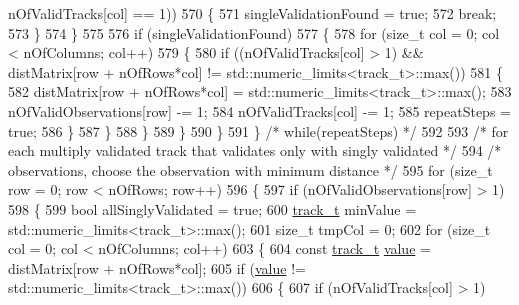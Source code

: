 \begin{DoxyCode}
      nOfValidTracks[col] == 1))
570                         \{
571                             singleValidationFound = \textcolor{keyword}{true};
572                             \textcolor{keywordflow}{break};
573                         \}
574                     \}
575 
576                     \textcolor{keywordflow}{if} (singleValidationFound)
577                     \{
578                         \textcolor{keywordflow}{for} (\textcolor{keywordtype}{size\_t} col = 0; col < nOfColumns; col++)
579                         \{
580                             \textcolor{keywordflow}{if} ((nOfValidTracks[col] > 1) && distMatrix[row + nOfRows*col] != 
      std::numeric\_limits<track\_t>::max())
581                             \{
582                                 distMatrix[row + nOfRows*col] = std::numeric\_limits<track\_t>::max();
583                                 nOfValidObservations[row] -= 1;
584                                 nOfValidTracks[col] -= 1;
585                                 repeatSteps = \textcolor{keyword}{true};
586                             \}
587                         \}
588                     \}
589                 \}
590             \}
591         \} \textcolor{comment}{/* while(repeatSteps) */}
592 
593         \textcolor{comment}{/* for each multiply validated track that validates only with singly validated  */}
594         \textcolor{comment}{/* observations, choose the observation with minimum distance */}
595         \textcolor{keywordflow}{for} (\textcolor{keywordtype}{size\_t} row = 0; row < nOfRows; row++)
596         \{
597             \textcolor{keywordflow}{if} (nOfValidObservations[row] > 1)
598             \{
599                 \textcolor{keywordtype}{bool} allSinglyValidated = \textcolor{keyword}{true};
600                 \mbox{\hyperlink{defines_8h_a7ce9c8817b42ab418e61756f579549ab}{track\_t}} minValue = std::numeric\_limits<track\_t>::max();
601                 \textcolor{keywordtype}{size\_t} tmpCol = 0;
602                 \textcolor{keywordflow}{for} (\textcolor{keywordtype}{size\_t} col = 0; col < nOfColumns; col++)
603                 \{
604                     \textcolor{keyword}{const} \mbox{\hyperlink{defines_8h_a7ce9c8817b42ab418e61756f579549ab}{track\_t}} \mbox{\hyperlink{struct_g_m_l__token_a50b20988e3fe419332313e8d9e02c775}{value}} = distMatrix[row + nOfRows*col];
605                     \textcolor{keywordflow}{if} (\mbox{\hyperlink{struct_g_m_l__token_a50b20988e3fe419332313e8d9e02c775}{value}} != std::numeric\_limits<track\_t>::max())
606                     \{
607                         \textcolor{keywordflow}{if} (nOfValidTracks[col] > 1)

\end{DoxyCode}
